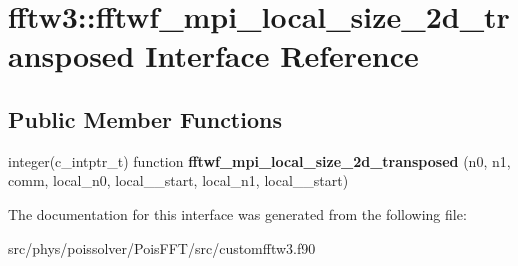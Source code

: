 \hypertarget{interfacefftw3_1_1fftwf__mpi__local__size__2d__transposed}{}\section{fftw3\+:\+:fftwf\+\_\+mpi\+\_\+local\+\_\+size\+\_\+2d\+\_\+transposed Interface Reference}
\label{interfacefftw3_1_1fftwf__mpi__local__size__2d__transposed}
\subsection*{Public Member Functions}
\begin{DoxyCompactItemize}
\item 
integer(c\+\_\+intptr\+\_\+t) function {\bfseries fftwf\+\_\+mpi\+\_\+local\+\_\+size\+\_\+2d\+\_\+transposed} (n0, n1, comm, local\+\_\+n0, local\+\_\+\_\+start, local\+\_\+n1, local\+\_\+\_\+start)\hypertarget{interfacefftw3_1_1fftwf__mpi__local__size__2d__transposed_a5f318e63ad56f9800c89f8d236f9721a}{}\label{interfacefftw3_1_1fftwf__mpi__local__size__2d__transposed_a5f318e63ad56f9800c89f8d236f9721a}

\end{DoxyCompactItemize}


The documentation for this interface was generated from the following file\+:\begin{DoxyCompactItemize}
\item 
src/phys/poissolver/\+Pois\+F\+F\+T/src/customfftw3.\+f90\end{DoxyCompactItemize}

